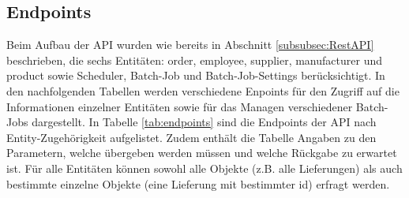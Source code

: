 \vspace{5pt}
\subsection{Endpoints}
Beim Aufbau der API wurden wie bereits in Abschnitt \ref{subsubsec:RestAPI} beschrieben, die sechs Entitäten: order, employee, supplier, manufacturer und product sowie Scheduler, Batch-Job und Batch-Job-Settings berücksichtigt. In den nachfolgenden Tabellen werden verschiedene Enpoints für den Zugriff auf die Informationen einzelner Entitäten sowie für das Managen verschiedener Batch-Jobs dargestellt.
In Tabelle \ref{tab:endpoints} sind die Endpoints der API nach Entity-Zugehörigkeit aufgelistet. Zudem enthält die Tabelle Angaben zu den Parametern, welche übergeben werden müssen und welche Rückgabe zu erwartet ist. Für alle Entitäten können sowohl alle Objekte (z.B. alle Lieferungen) als auch bestimmte einzelne Objekte (eine Lieferung mit bestimmter id) erfragt werden.

